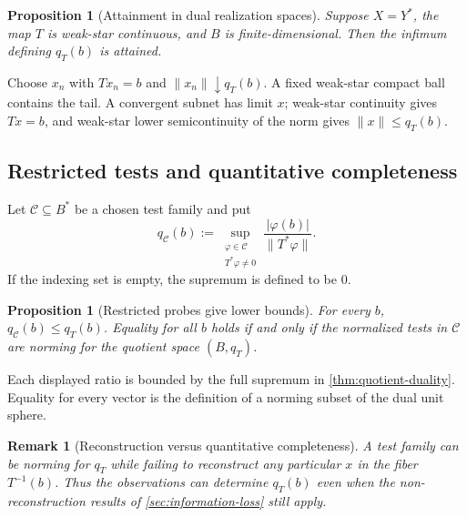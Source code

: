 \documentclass[12pt,a4paper,twoside]{extarticle}
\makeatletter
\theoremstyle{compactplain}
\newtheorem{proposition}[theorem]{Proposition}
\theoremstyle{compactdef}
\newtheorem{remark}[theorem]{Remark}
\renewenvironment{proof}[1][\proofname]{\par\pushQED{\qed}\normalfont
  \topsep2pt\trivlist\item[\hskip\labelsep\bfseries #1\@addpunct{.}]\ignorespaces}
 {\popQED\endtrivlist\@endpefalse}
\makeatother
\begin{document}
\begin{proposition}[Attainment in dual realization spaces]\label{prop:dual-attainment}
Suppose $X=Y^*$, the map $T$ is weak-star continuous, and $B$ is finite-dimensional.  Then the infimum defining $q_T(b)$ is attained.
\end{proposition}
\begin{proof}
Choose $x_n$ with $Tx_n=b$ and $\|x_n\|\downarrow q_T(b)$.  A fixed weak-star compact ball contains the tail.  A convergent subnet has limit $x$; weak-star continuity gives $Tx=b$, and weak-star lower semicontinuity of the norm gives $\|x\|\le q_T(b)$.
\end{proof}

\subsection{Restricted tests and quantitative completeness}
Let $\mathcal C\subseteq B^*$ be a chosen test family and put
\[
  q_{\mathcal C}(b):=
  \sup_{\substack{\varphi\in\mathcal C\\T^*\varphi\ne0}}
  \frac{|\varphi(b)|}{\|T^*\varphi\|}.
\]
If the indexing set is empty, the supremum is defined to be $0$.
\begin{proposition}[Restricted probes give lower bounds]
For every $b$, $q_{\mathcal C}(b)\le q_T(b)$.  Equality for all $b$ holds if and only if the normalized tests in $\mathcal C$ are norming for the quotient space $(B,q_T)$.
\end{proposition}
\begin{proof}
Each displayed ratio is bounded by the full supremum in \cref{thm:quotient-duality}.  Equality for every vector is the definition of a norming subset of the dual unit sphere.
\end{proof}

\begin{remark}[Reconstruction versus quantitative completeness]
A test family can be norming for $q_T$ while failing to reconstruct any particular $x$ in the fiber $T^{-1}(b)$.  Thus the observations can determine $q_T(b)$ even when the non-reconstruction results of \cref{sec:information-loss} still apply.
\end{remark}
\end{document}
